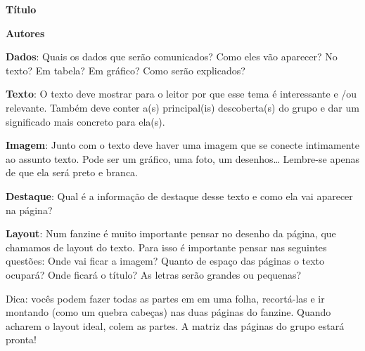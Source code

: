 \textbf{Título}

\textbf{Autores}

\textbf{Dados}: Quais os dados que serão comunicados? Como eles vão aparecer? No texto? Em tabela? Em gráfico? Como serão explicados?

\textbf{Texto}: O texto deve mostrar para o leitor por que esse tema é interessante e /ou relevante. Também deve conter a(s) principal(is) descoberta(s) do grupo e dar um significado mais concreto para ela(s).

\textbf{Imagem}: Junto com o texto deve haver uma imagem que se conecte intimamente ao assunto texto. Pode ser um gráfico, uma foto, um desenhos… Lembre-se apenas de que ela será preto e branca.

\textbf{Destaque}:
Qual é a informação de destaque desse texto e como ela vai aparecer na página?

\textbf{Layout}:
Num fanzine é muito importante pensar no desenho da página, que chamamos de layout do texto. Para isso é importante pensar nas seguintes questões: Onde vai ficar a imagem? Quanto de espaço das páginas o texto ocupará? Onde ficará o título? As letras serão grandes ou pequenas?


Dica: vocês podem fazer todas as partes em em uma folha,  recortá-las e ir montando (como um quebra cabeças) nas duas páginas do fanzine. Quando acharem o layout ideal, colem as partes. A matriz das páginas do grupo  estará pronta!

\fi

\ifnum{}
\clearpage
\else
\notasfinais
\fi




\nocite{*}